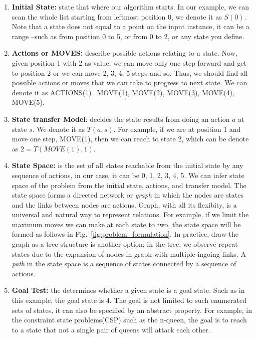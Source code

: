 \documentclass[../main.tex]{subfiles}
\begin{document}
\begin{enumerate}
    \item \textbf{Initial State:} state that where our algorithm starts. In our example, we can scan the whole list starting from leftmost position 0, we denote it as $S(0)$. Note that a state does not equal to a point on the input instance, it can be a range --such as from position 0 to 5, or from 0 to 2, or any state you define. 
    \item \textbf{Actions or MOVES:} describe possible actions relating to a state. Now, given position 1 with 2 as value, we can move only one step forward and get to position 2 or we can move 2, 3, 4, 5 steps and so. Thus, we should find all possible actions or moves that we can take to progress to next state. We can denote it as ACTIONS(1)={MOVE(1), MOVE(2), MOVE(3), MOVE(4), MOVE(5)}. 
    
    \item \textbf{State transfer Model}: decides the state results from doing an action $a$ at state $s$. We denote it as $T(a, s)$. For example, if we are at position 1 and move one step, MOVE(1), then we can reach to state 2, which can be denote as $2=T(MOVE(1), 1)$. %
    
   \item \textbf{State Space:} is the set of all states reachable from the initial state by any sequence of actions, in our case, it can be {0, 1, 2, 3, 4, 5}. We can infer state space of the problem from the initial state, actions, and transfer model. The state space forms a directed network or \textit{graph} in which the nodes are states and the links between nodes are actions. Graph, with all its flexibity, is a universal and natural way to represent relations. For example, if we limit the maximum moves we can make at each state to two, the state space will be formed as follows in Fig.~\ref{fig:problem_formulation}. In practice, draw the graph as a tree structure is another option; in the tree, we observe repeat states due to the expansion of nodes in graph with multiple ingoing links.  A \textit{path} in the state space is a sequence of states connected by a sequence of actions. 
    
    
   \item  \textbf{Goal Test:} the determines whether a given state is a goal state. %
   Such as in this example, the goal state is $4$. The goal is not limited to such enumerated sets of states, it can also be specified by an abstract property. For example, in the constraint state problems(CSP) such as the n-queen, the goal is to reach to a state that not a single pair of queens will attack each other. 
\end{enumerate}
\end{document}
